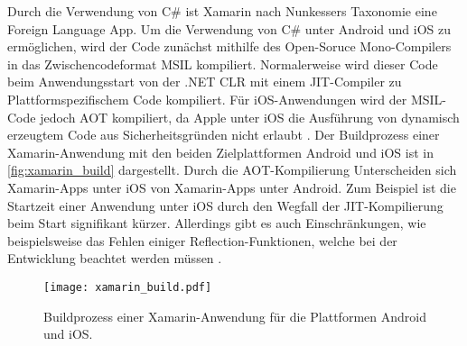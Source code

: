 Durch die Verwendung von C\# ist Xamarin nach Nunkessers Taxonomie \cite{Nunkesser_Taxonomy_Apps} eine Foreign Language App.
Um die Verwendung von C\# unter Android und iOS zu ermöglichen, wird der Code zunächst mithilfe des Open-Soruce Mono-Compilers in das Zwischencodeformat \ac{MSIL} kompiliert.
Normalerweise wird dieser Code beim Anwendungsstart von der .NET \ac{CLR} mit einem \ac{JIT}-Compiler zu Plattformspezifischem Code kompiliert.
Für iOS-Anwendungen wird der \ac{MSIL}-Code jedoch \ac{AOT} kompiliert, da Apple unter iOS die Ausführung von dynamisch erzeugtem Code aus Sicherheitsgründen nicht erlaubt \cite{Xamarin_iOS}.
Der Buildprozess einer Xamarin-Anwendung mit den beiden Zielplattformen Android und iOS ist in \autoref{fig:xamarin_build} dargestellt.
Durch die \ac{AOT}-Kompilierung Unterscheiden sich Xamarin-Apps unter iOS von Xamarin-Apps unter Android.
Zum Beispiel ist die Startzeit einer Anwendung unter iOS durch den Wegfall der \ac{JIT}-Kompilierung beim Start signifikant kürzer.
Allerdings gibt es auch Einschränkungen, wie beispielsweise das Fehlen einiger Reflection-Funktionen, welche bei der Entwicklung beachtet werden müssen \cite{Xamarin_iOS,Xamarin_iOS_Limitations}.
\begin{figure}[h]
    \centering
    \texttt{[image: xamarin\_build.pdf]}
    \caption{Buildprozess einer Xamarin-Anwendung für die Plattformen Android und iOS.}
    \label{fig:xamarin_build}
\end{figure}


